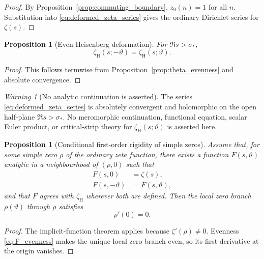 \documentclass[11pt]{amsart}
\numberwithin{equation}{section}
\theoremstyle{plain}
\newtheorem{proposition}[theorem]{Proposition}
\theoremstyle{definition}
\theoremstyle{remark}
\newtheorem{warning}[theorem]{Warning}
\begin{document}
\begin{proof}
By Proposition~\ref{prop:commuting_boundary}, $z_0(n)=1$ for all $n$.
Substitution into \eqref{eq:deformed_zeta_series} gives the ordinary
Dirichlet series for $\zeta(s)$.
\end{proof}

\begin{proposition}[Even Heisenberg deformation]
\label{prop:zeta_theta_even}
For $\Re s>\sigma_*$,
\begin{equation}
\zeta_{\mathrm H}(s;-\vartheta)
=
\zeta_{\mathrm H}(s;\vartheta).
\label{eq:zeta_theta_even}
\end{equation}
\end{proposition}

\begin{proof}
This follows termwise from Proposition~\ref{prop:theta_evenness} and absolute
convergence.
\end{proof}

\begin{warning}[No analytic continuation is asserted]
\label{warn:no_continuation}
The series \eqref{eq:deformed_zeta_series} is absolutely convergent and holomorphic on the open half-plane $\Re s>\sigma_*$.  No meromorphic continuation, functional equation, scalar Euler product, or critical-strip theory
for $\zeta_{\mathrm H}(s;\vartheta)$ is asserted here.
\end{warning}

\begin{proposition}[Conditional first-order rigidity of simple zeros]
\label{prop:conditional_zero_rigidity}
Assume that, for some simple zero $\rho$ of the ordinary zeta function,
there exists a function $F(s,\vartheta)$ analytic in a neighbourhood of
$(\rho,0)$ such that
\begin{align}
F(s,0)
&=\zeta(s),
\label{eq:F_classical_boundary}\\
F(s,-\vartheta)
&=F(s,\vartheta),
\label{eq:F_evenness}
\end{align}
and that $F$ agrees with $\zeta_{\mathrm H}$ wherever both are defined.
Then the local zero branch $\rho(\vartheta)$ through $\rho$ satisfies
\begin{equation}
\rho'(0)=0.
\label{eq:zero_first_derivative_zero}
\end{equation}
\end{proposition}

\begin{proof}
The implicit-function theorem applies because $\zeta'(\rho)\neq0$.
Evenness \eqref{eq:F_evenness} makes the unique local zero branch even, so
its first derivative at the origin vanishes.
\end{proof}
\end{document}
